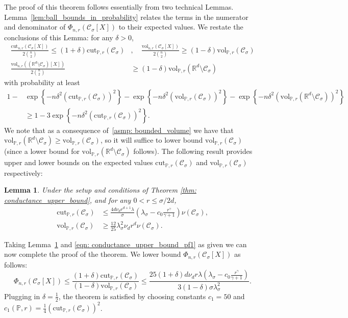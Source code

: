 \documentclass[11pt,twoside]{article}
\newtheorem{lemma}{Lemma}
\newcommand{\set}[1]{\left\{#1\right\}}
\newcommand{\vol}{\mathrm{vol}}
\newcommand{\cut}{\mathrm{cut}}
\newcommand{\Reals}{\mathbb{R}}
\newcommand{\Rd}{\Reals^d}
\newcommand{\1}{\mathbf{1}}
\newcommand{\Xbf}{X}             %
\newcommand{\Pbb}{\mathbb{P}}
\newcommand{\Cset}{\mathcal{C}}
\newcommand{\Csig}{\Cset_{\sigma}}
\begin{document}
The proof of this theorem follows essentially from two technical Lemmas. 
Lemma~\ref{lem:ball_bounds_in_probability} relates the terms in the numerator and denominator of $\Phi_{n,r}(\Csig[\Xbf])$ to their expected values. We restate the conclusions of this Lemma: for any $\delta > 0$,
\begin{align}
\frac{\cut_{n,r}(\Csig[\Xbf])}{2{n \choose 2}} \leq (1 + \delta)\cut_{\Pbb,r}(\Csig) &, \quad \frac{\vol_{n,r}(\Csig[\Xbf])}{2{n \choose 2}} \geq (1 - \delta)\vol_{\Pbb,r}(\Csig) \nonumber \\ \frac{\vol_{n,r}((\Rd \setminus \Csig)[\Xbf])}{2{n \choose 2}}& \geq (1 - \delta)\vol_{\Pbb,r}(\Rd \setminus \Csig) \label{eqn: conductance_upper_bound_pf1}
\end{align}
with probability at least 
\begin{align*}
1 - & \exp\set{-n \delta^2 (\cut_{\Pbb,r}(\Csig))^2} - \exp\set{-n \delta^2 (\vol_{\Pbb,r}(\Csig))^2} - \exp\set{-n \delta^2 (\vol_{\Pbb,r}(\Rd\setminus \Csig))^2} \\
& \geq 1 - 3\exp\set{-n \delta^2 (\cut_{\Pbb,r}(\Csig))^2}.
\end{align*} 
We note that as a consequence of~\ref{asmp: bounded_volume} we have that $\vol_{\Pbb,r}(\Rd \setminus \Csig)  \geq \vol_{\Pbb,r}(\Csig)$, so it will suffice to lower bound $\vol_{\Pbb,r}(\Csig)$ (since a lower bound for $\vol_{\Pbb,r}(\Rd \setminus \Csig)$ follows).
The following result provides upper and lower bounds on the expected values $\cut_{\Pbb,r}(\Csig)$ and $\vol_{\Pbb,r}(\Csig)$ respectively:
\begin{lemma}
	\label{lem: expected_density_cut}\label{lem: expected_density_volume}
	Under the setup and conditions of Theorem \ref{thm: conductance_upper_bound}, and for any $0 < r \leq \sigma/2d$,
	\begin{align}
	\cut_{\Pbb,r}(\Csig) &\leq \frac{4 d \nu_d r^{d+1} \lambda}{\sigma} \left(\lambda_{\sigma} - c_0\frac{r^{\gamma}}{\gamma + 1}\right) \nu(\Csig), \label{eqn:claim_one} \\
	\vol_{\Pbb,r}(\Csig) &\geq \frac{12}{25} \lambda_{\sigma}^2 \nu_d r^d \nu(\Csig).\label{eqn:claim_two}
	\end{align}
\end{lemma}
Taking Lemma~\ref{lem: expected_density_cut} and \eqref{eqn: conductance_upper_bound_pf1} as given we can now complete the proof of the theorem. We lower bound $\Phi_{n,r}(\Csig[\Xbf])$ as follows:
\begin{equation*}
\Phi_{n,r}(\Csig[\Xbf]) \leq \frac{(1 + \delta)\cut_{\Pbb,r}(\Csig)}{(1 - \delta)\vol_{\Pbb,r}(\Csig)} \leq \frac{25(1 + \delta)d \nu_d r \lambda \left(\lambda_{\sigma} - c_0\frac{r^{\gamma}}{\gamma + 1}\right)}{3(1 - \delta) \sigma \lambda_{\sigma}^2}.
\end{equation*}
Plugging in $\delta = \frac{1}{2}$, the theorem is satisfied by choosing constants $c_1 = 50$ and $c_1(\Pbb,r) = \frac{1}{4}(\cut_{\Pbb,r}(\Csig))^2$. 
\end{document}
